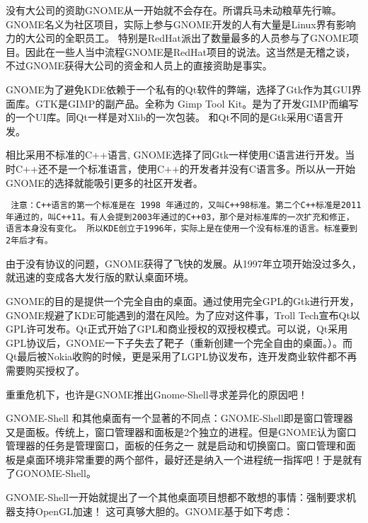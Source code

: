 \documentclass[amstex,twoside]{ctexbook}
\newenvironment{notice}{\tt}{}
\begin{document}
没有大公司的资助GNOME从一开始就不会存在。所谓兵马未动粮草先行嘛。GNOME名义为社区项目，实际上参与GNOME开发的人有大量是Linux界有影响力的大公司的全职员工。
特别是RedHat派出了数量最多的人员参与了GNOME项目。因此在一些人当中流程GNOME是RedHat项目的说法。这当然是无稽之谈，不过GNOME获得大公司的资金和人员上的直接资助是事实。

GNOME为了避免KDE依赖于一个私有的Qt软件的弊端，选择了Gtk作为其GUI界面库。GTK是GIMP的副产品。全称为 Gimp Tool Kit。是为了开发GIMP而编写的一个UI库。同Qt一样是对Xlib的一次包装。
和Qt不同的是Gtk采用C语言开发。

相比采用不标准的C++语言, GNOME选择了同Gtk一样使用C语言进行开发。当时C++还不是一个标准语言，使用C++的开发者并没有C语言多。所以从一开始GNOME的选择就能吸引更多的社区开发者。

\begin{notice}
注意：C++语言的第一个标准是在 1998 年通过的，又叫C++98标准。第二个C++标准是2011年通过的，叫C++11。有人会提到2003年通过的C++03，那个是对标准库的一次扩充和修正，语言本身没有变化。
所以KDE创立于1996年，实际上是在使用一个没有标准的语言。标准要到2年后才有。
\end{notice}

由于没有协议的问题，GNOME获得了飞快的发展。从1997年立项开始没过多久，就迅速的变成各大发行版的默认桌面环境。

GNOME的目的是提供一个完全自由的桌面。通过使用完全GPL的Gtk进行开发，GNOME规避了KDE可能遇到的潜在风险。为了应对这件事，Troll Tech宣布Qt以GPL许可发布。Qt正式开始了GPL和商业授权的双授权模式。可以说，Qt采用GPL协议后，GNOME一下子失去了靶子（重新创建一个完全自由的桌面。）。而Qt最后被Nokia收购的时候，更是采用了LGPL协议发布，连开发商业软件都不再需要购买授权了。

重重危机下，也许是GNOME推出Gnome-Shell寻求差异化的原因吧！

GNOME-Shell 和其他桌面有一个显著的不同点：GNOME-Shell即是窗口管理器又是面板。传统上，窗口管理器和面板是2个独立的进程。但是GNOME认为窗口管理器的任务是管理窗口，面板的任务之一
就是启动和切换窗口。窗口管理和面板是桌面环境非常重要的两个部件，最好还是纳入一个进程统一指挥吧！于是就有了GONOME-Shell。

GNOME-Shell一开始就提出了一个其他桌面项目想都不敢想的事情：强制要求机器支持OpenGL加速！ 这可真够大胆的。GNOME基于如下考虑：
\end{document}
